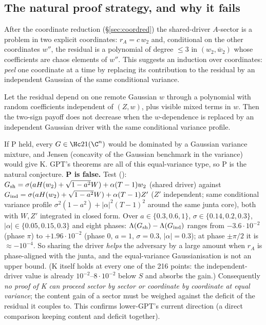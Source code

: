 \subsection{The natural proof strategy, and why it fails}
After the coordinate reduction (\S\ref{sec:coordred}) the shared-driver $A$-sector is a problem in two explicit coordinates: $r_A=c\,w_2$ and, conditional on the other
coordinates $w''$, the residual is a polynomial of degree $\le3$ in $(w_2,\bar w_2)$ whose coefficients are chaos elements of $w''$. This suggests an induction over
coordinates: \emph{peel} one coordinate at a time by replacing its contribution to the residual by an independent Gaussian of the same conditional variance.
\begin{definition}
Let the residual depend on one remote Gaussian $w$ through a polynomial with random coefficients independent of $(Z,w)$, plus visible mixed terms in $w$. Then the two-sign payoff
does not decrease when the $w$-dependence is replaced by an independent Gaussian driver with the same conditional variance profile.
\end{definition}
If P held, every $G\in\Hc21(\C^n)$ would be dominated by a Gaussian variance mixture, and Jensen (concavity of the Gaussian benchmark in the variance) would give K.
GPT's theorems are all of this equal-variance type, so P is the natural conjecture. \textbf{P is false.} Test (): $G_{\rm sh}=\sigma(aH(w_2)+\sqrt{1-a^2}W)+\alpha(T-1)w_2$
(shared driver) against $G_{\rm ind}=\sigma(aH(w_2)+\sqrt{1-a^2}W)+\alpha(T-1)Z'$ ($Z'$ independent; same conditional variance profile $\sigma^2(1-a^2)+|\alpha|^2(T-1)^2$ around the same
junta core), both with $W,Z'$ integrated in closed form. Over $a\in\{0.3,0.6,1\}$, $\sigma\in\{0.14,0.2,0.3\}$, $|\alpha|\in\{0.05,0.15,0.3\}$ and eight phases:
$\Lambda(G_{\rm sh})-\Lambda(G_{\rm ind})$ ranges from $-3.6\cdot10^{-2}$ (phase $\pi$) to $+1.96\cdot10^{-2}$ (phase $0$, $a=1$, $\sigma=0.3$, $|\alpha|=0.3$); at phase $\pm\pi/2$ it is
$\approx-10^{-4}$. So sharing the driver \emph{helps} the adversary by a large amount when $r_A$ is phase-aligned with the junta, and the equal-variance Gaussianisation is not an
upper bound. (K itself holds at every one of the 216 points: the independent-driver value is already $10^{-2}$--$8\cdot10^{-2}$ below $S$ and absorbs the gain.) Consequently
\emph{no proof of K can proceed sector by sector or coordinate by coordinate at equal variance}; the content gain of a sector must be weighed against the deficit of the residual it
couples to. This confirms lower-GPT's current direction (a direct comparison keeping content and deficit together).

